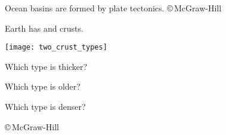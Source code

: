 \documentclass[t]{beamer}
\begin{document}
%
%
%
%
%
%
%
%
%
%
%
%
%
%
{
\begin{frame}[b]{Ocean basins are formed by plate tectonics.}
\hfill \tiny \copyright\,McGraw-Hill
\end{frame}
}
%
\begin{frame}[t]{Earth has  and  crusts.}

\begin{multicols}{2}

\texttt{[image: two\_crust\_types]}

\columnbreak

\hangpara Which type is thicker?

\hangpara Which type is older?

\hangpara Which type is denser?
\end{multicols}

\vfilll

\hfill \tiny \copyright\,McGraw-Hill

\end{frame}
%
\end{document}
